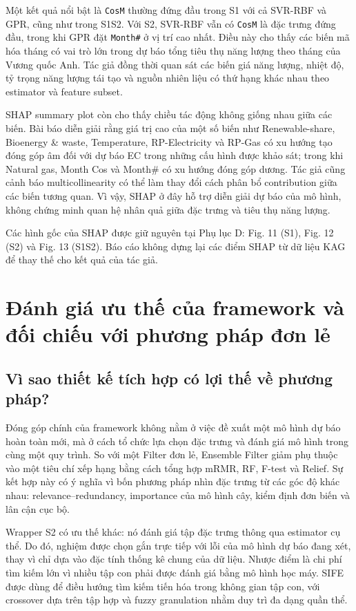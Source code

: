 Một kết quả nổi bật là \texttt{CosM} thường đứng đầu trong S1 với cả SVR-RBF và GPR, cũng như trong S1S2. Với S2, SVR-RBF vẫn có \texttt{CosM} là đặc trưng đứng đầu, trong khi GPR đặt \texttt{Month\#} ở vị trí cao nhất. Điều này cho thấy các biến mã hóa tháng có vai trò lớn trong dự báo tổng tiêu thụ năng lượng theo tháng của Vương quốc Anh. Tác giả đồng thời quan sát các biến giá năng lượng, nhiệt độ, tỷ trọng năng lượng tái tạo và nguồn nhiên liệu có thứ hạng khác nhau theo estimator và feature subset.

SHAP summary plot còn cho thấy chiều tác động không giống nhau giữa các biến. Bài báo diễn giải rằng giá trị cao của một số biến như Renewable-share, Bioenergy \& waste, Temperature, RP-Electricity và RP-Gas có xu hướng tạo đóng góp âm đối với dự báo EC trong những cấu hình được khảo sát; trong khi Natural gas, Month Cos và Month\# có xu hướng đóng góp dương. Tác giả cũng cảnh báo multicollinearity có thể làm thay đổi cách phân bổ contribution giữa các biến tương quan. Vì vậy, SHAP ở đây hỗ trợ diễn giải dự báo của mô hình, không chứng minh quan hệ nhân quả giữa đặc trưng và tiêu thụ năng lượng.

Các hình gốc của SHAP được giữ nguyên tại Phụ lục D: Fig. 11 (S1), Fig. 12 (S2) và Fig. 13 (S1S2). Báo cáo không dựng lại các điểm SHAP từ dữ liệu KAG để thay thế cho kết quả của tác giả.

\section{Đánh giá ưu thế của framework và đối chiếu với phương pháp đơn lẻ}

\subsection{Vì sao thiết kế tích hợp có lợi thế về phương pháp?}

Đóng góp chính của framework không nằm ở việc đề xuất một mô hình dự báo hoàn toàn mới, mà ở cách tổ chức lựa chọn đặc trưng và đánh giá mô hình trong cùng một quy trình. So với một Filter đơn lẻ, Ensemble Filter giảm phụ thuộc vào một tiêu chí xếp hạng bằng cách tổng hợp mRMR, RF, F-test và Relief. Sự kết hợp này có ý nghĩa vì bốn phương pháp nhìn đặc trưng từ các góc độ khác nhau: relevance--redundancy, importance của mô hình cây, kiểm định đơn biến và lân cận cục bộ.

Wrapper S2 có ưu thế khác: nó đánh giá tập đặc trưng thông qua estimator cụ thể. Do đó, nghiệm được chọn gắn trực tiếp với lỗi của mô hình dự báo đang xét, thay vì chỉ dựa vào đặc tính thống kê chung của dữ liệu. Nhược điểm là chi phí tìm kiếm lớn vì nhiều tập con phải được đánh giá bằng mô hình học máy. SIFE được dùng để điều hướng tìm kiếm tiến hóa trong không gian tập con, với crossover dựa trên tập hợp và fuzzy granulation nhằm duy trì đa dạng quần thể.

